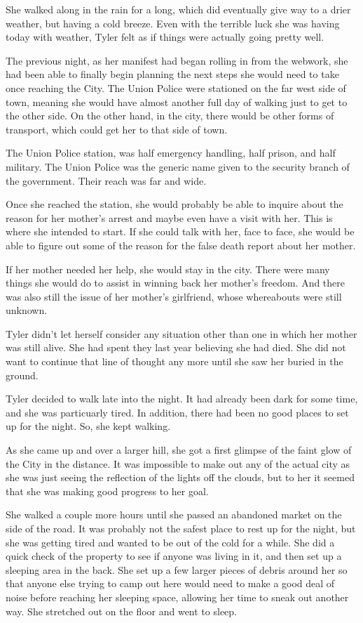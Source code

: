 \documentclass[courier]{sffms}
\begin{document}
She walked along in the rain for a long, which did eventually
give way to a drier weather, but having a cold breeze.
Even with the terrible luck she was having today with
weather, Tyler felt as if things were actually going pretty
well.

The previous night, as her manifest had began rolling in
from the webwork, she had been able to finally begin
planning the next steps she would need to take once
reaching the City. The Union Police were stationed on
the far west side of town, meaning she would have
almost another full day of walking just to get to the
other side. On the other hand, in the city, there would
be other forms of transport, which could get her to that
side of town.

The Union Police station, was half emergency handling,
half prison, and half military. The Union Police was the
generic name given to the security branch of the
government. Their reach was far and wide.

Once she reached the station, she would probably be
able to inquire about the reason for her mother's
arrest and maybe even have a visit with her. This is
where she intended to start. If she could talk with
her, face to face, she would be able to figure out some
of the reason for the false death report about her mother.

If her mother needed her help, she would stay in the
city. There were many things she would do to assist
in winning back her mother's freedom. And there was
also still the issue of her mother's girlfriend, whose
whereabouts were still unknown.

Tyler didn't let herself consider any situation other than
one in which her mother was still alive. She had spent
they last year believing she had died. She did not want
to continue that line of thought any more until she
saw her buried in the ground.

Tyler decided to walk late into the night. It had already
been dark for some time, and she was particuarly tired.
In addition, there had been no good places to set up
for the night. So, she kept walking.

As she came up and over a larger hill, she got a first
glimpse of the faint glow of the City in the distance.
It was impossible to make out any of the actual city
as she was just seeing the reflection of the lights off
the clouds, but to her it seemed that she was making
good progress to her goal.

She walked a couple more hours until she passed an
abandoned market on the side of the road. It was
probably not the safest place to rest up for the night,
but she was getting tired and wanted to be out of the
cold for a while. She did a quick check of the 
property to see if anyone was living in it, and then set
up a sleeping area in the back. She set up a few larger
pieces of debris around her so that anyone else trying 
to camp out here would need to make a good deal
of noise before reaching her sleeping space, allowing
her time to sneak out another way. She stretched out
on the floor and went to sleep. 
\end{document}
